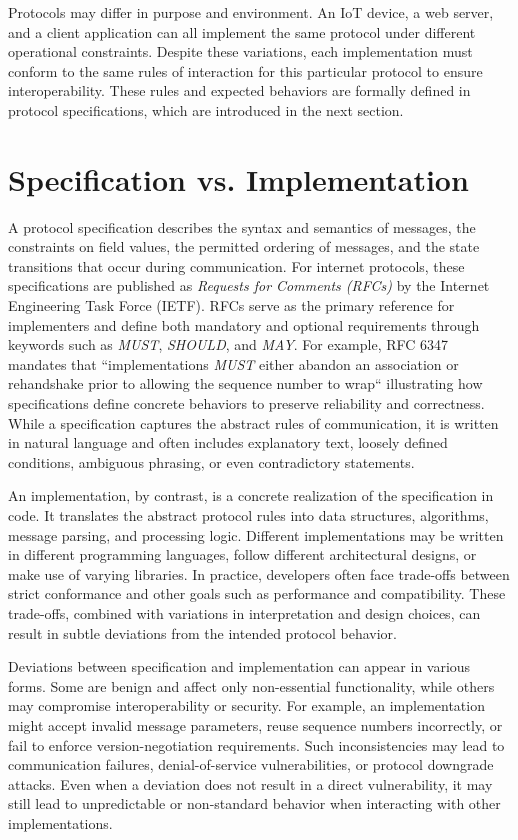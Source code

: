 Protocols may differ in purpose and environment.
An IoT device, a web server, and a client application can all implement the same protocol under different operational constraints.
Despite these variations, each implementation must conform to the same rules of interaction for this particular protocol to ensure interoperability.
These rules and expected behaviors are formally defined in protocol specifications, which are introduced in the next section.

\section{Specification vs. Implementation}
A protocol specification describes the syntax and semantics of messages, the constraints on field values, the permitted ordering of messages, and the state transitions that occur during communication. 
For internet protocols, these specifications are published as \emph{Requests for Comments (RFCs)} by the Internet Engineering Task Force (IETF). 
RFCs serve as the primary reference for implementers and define both mandatory and optional requirements through keywords such as \emph{MUST}, \emph{SHOULD}, and \emph{MAY}. 
For example, RFC 6347~\cite[p. 9]{RFC6347} mandates that ``implementations \emph{MUST} either abandon an association or rehandshake prior to allowing the sequence number to wrap`` illustrating how specifications define concrete behaviors to preserve reliability and correctness. 
While a specification captures the abstract rules of communication, it is written in natural language and often includes explanatory text, loosely defined conditions, ambiguous phrasing, or even contradictory statements.

An implementation, by contrast, is a concrete realization of the specification in code.
It translates the abstract protocol rules into data structures, algorithms, message parsing, and processing logic.
Different implementations may be written in different programming languages, follow different architectural designs, or make use of varying libraries.
In practice, developers often face trade-offs between strict conformance and other goals such as performance and compatibility.
These trade-offs, combined with variations in interpretation and design choices, can result in subtle deviations from the intended protocol behavior.

Deviations between specification and implementation can appear in various forms.
Some are benign and affect only non-essential functionality, while others may compromise interoperability or security.
For example, an implementation might accept invalid message parameters, reuse sequence numbers incorrectly, or fail to enforce version-negotiation requirements.
Such inconsistencies may lead to communication failures, denial-of-service vulnerabilities, or protocol downgrade attacks.
Even when a deviation does not result in a direct vulnerability, it may still lead to unpredictable or non-standard behavior when interacting with other implementations.

